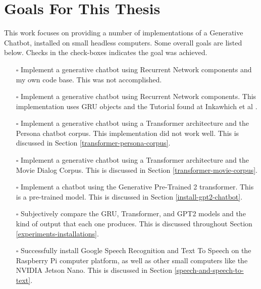 
\section{Goals For This Thesis}
This work focuses on providing a number of implementations of a Generative Chatbot, installed on small headless computers. Some overall goals are listed below. Checks in the check-boxes indicates the goal was achieved.

\begin{itemize}
	\item[\rlap{\raisebox{0.3ex}{\hspace{0.4ex}\scriptsize \ding{56}}}$\square$] Implement a generative chatbot using Recurrent Network components and my own code base. This was not accomplished.
	\item[\rlap{\raisebox{0.3ex}{\hspace{0.4ex}\tiny \ding{52}}}$\square$] Implement a generative chatbot using Recurrent Network components. This implementation uses GRU objects and the Tutorial found at Inkawhich et al \cite{2018Inkawhich}.
	\item[\rlap{\raisebox{0.3ex}{\hspace{0.4ex}\scriptsize \ding{56}}}$\square$] Implement a generative chatbot using a Transformer architecture and the Persona chatbot corpus. This implementation did not work well. This is discussed in Section \ref{transformer-persona-corpus}. %
	\item[\rlap{\raisebox{0.3ex}{\hspace{0.4ex}\tiny \ding{52}}}$\square$] Implement a generative chatbot using a Transformer architecture and the Movie Dialog Corpus. This is discussed in Section \ref{transformer-movie-corpus}. %
	\item[\rlap{\raisebox{0.3ex}{\hspace{0.4ex}\tiny \ding{52}}}$\square$] Implement a chatbot using the Generative Pre-Trained 2 transformer. This is a pre-trained model. This is discussed in Section \ref{install-gpt2-chatbot}.
	\item[\rlap{\raisebox{0.3ex}{\hspace{0.4ex}\tiny \ding{52}}}$\square$] Subjectively compare the GRU, Transformer, and GPT2 models and the kind of output that each one produces. This is discussed throughout Section \ref{experiments-installations}.
	\item[\rlap{\raisebox{0.3ex}{\hspace{0.4ex}\tiny \ding{52}}}$\square$] Successfully install Google Speech Recognition and Text To Speech on the Raspberry Pi computer platform, as well as other small computers like the NVIDIA Jetson Nano. This is discussed in Section \ref{speech-and-speech-to-text}.

\end{itemize}
